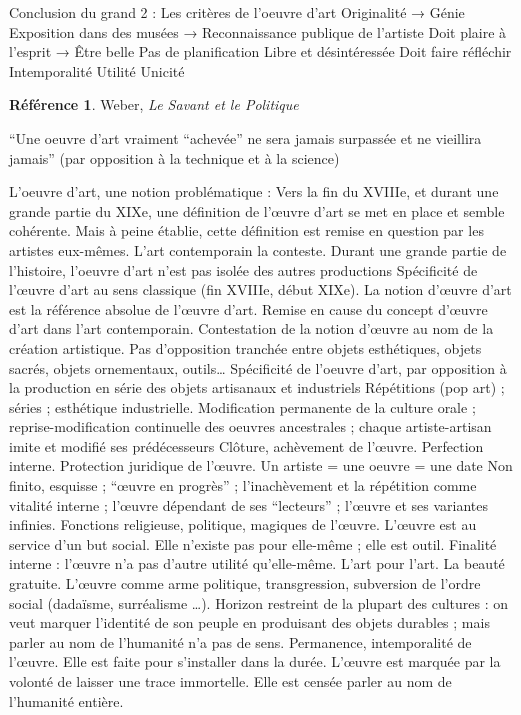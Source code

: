 \documentclass[french]{book}
\theoremstyle{definition}
\newtheorem*{refe}{Référence}
\begin{document}
Conclusion du grand 2 : Les critères de l’oeuvre d’art
Originalité → Génie
Exposition dans des musées → Reconnaissance publique de l’artiste
Doit plaire à l’esprit → Être belle
Pas de planification
Libre et désintéressée
Doit faire réfléchir
Intemporalité
Utilité
Unicité
\begin{refe}
	Weber, \textit{Le Savant et le Politique}
\end{refe} “Une oeuvre d’art vraiment “achevée” ne sera jamais surpassée et ne vieillira jamais” (par opposition à la technique et à la science)

L’oeuvre d’art, une notion problématique :
Vers la fin du XVIIIe, et durant une grande partie du XIXe, une définition de l'œuvre d’art se met en place et semble cohérente. Mais à peine établie, cette définition est remise en question par les artistes eux-mêmes. L’art contemporain la conteste.
Durant une grande partie de l’histoire, l’oeuvre d’art n’est pas isolée des autres productions
Spécificité de l'œuvre d’art au sens classique (fin XVIIIe, début XIXe). La notion d'œuvre d’art est la référence absolue de l'œuvre d’art.
Remise en cause du concept d'œuvre d’art dans l’art contemporain. Contestation de la notion d'œuvre au nom de la création artistique.
Pas d'opposition tranchée entre objets esthétiques, objets sacrés, objets ornementaux, outils…
Spécificité de l'oeuvre d'art, par opposition à la production en série des objets artisanaux et industriels
Répétitions (pop art) ; séries ; esthétique industrielle.
Modification permanente de la culture orale ; reprise-modification continuelle des oeuvres ancestrales ; chaque artiste-artisan imite et modifié ses prédécesseurs 
Clôture, achèvement de l'œuvre.
Perfection interne.
Protection juridique de l'œuvre.
Un artiste = une oeuvre = une date
Non finito, esquisse ; “œuvre en progrès” ; l’inachèvement et la répétition comme vitalité interne ; l'œuvre dépendant de ses “lecteurs” ; l'œuvre et ses variantes infinies.
Fonctions religieuse, politique, magiques de l'œuvre. L'œuvre est au service d'un but social. Elle n'existe pas pour elle-même ; elle est outil.
Finalité interne : l'œuvre n'a pas d'autre utilité qu'elle-même.
L'art pour l'art.
La beauté gratuite.
L'œuvre comme arme politique, transgression, subversion de l’ordre social (dadaïsme, surréalisme …).
Horizon restreint de la plupart des cultures : on veut marquer l'identité de son peuple en produisant des objets durables ; mais parler au nom de l'humanité n'a pas de sens.
Permanence, intemporalité de l'œuvre. Elle est faite pour s'installer dans la durée. L'œuvre est marquée par la volonté de laisser une trace immortelle. Elle est censée parler au nom de l'humanité entière.
\end{document}
